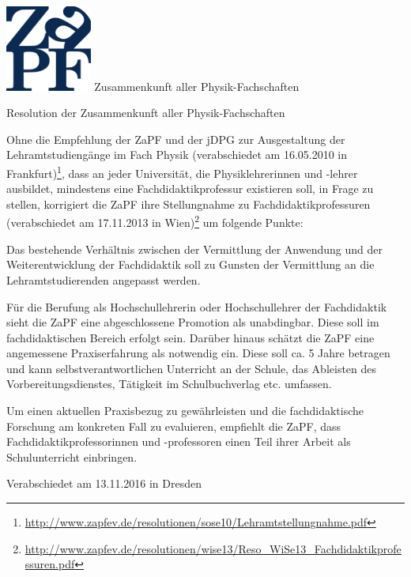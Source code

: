 \documentclass[DIV=calc]{scrartcl}
\begin{document}
\hspace{0.87\textwidth}
\begin{minipage}{120pt}
\vspace{-1.8cm}
\includegraphics[width=80pt]{logo.pdf}
\centering
\small Zusammenkunft aller Physik-Fachschaften
\end{minipage}
\begin{center}
\huge{Resolution der Zusammenkunft aller Physik-Fachschaften} \\
\normalsize
\end{center}

\vspace{1cm}

Ohne die Empfehlung der ZaPF und der jDPG zur Ausgestaltung der Lehramtstudiengänge im Fach Physik (verabschiedet am 16.05.2010 in Frankfurt)\footnote{\url{http://www.zapfev.de/resolutionen/sose10/Lehramtstellungnahme.pdf}}, dass an jeder Universität, die Physiklehrerinnen und -lehrer ausbildet, mindestens eine Fachdidaktikprofessur existieren soll, in Frage zu stellen, korrigiert die ZaPF ihre Stellungnahme zu Fachdidaktikprofessuren (verabschiedet am 17.11.2013 in Wien)\footnote{\url{http://www.zapfev.de/resolutionen/wise13/Reso_WiSe13_Fachdidaktikprofessuren.pdf}} um folgende Punkte:

Das bestehende Verhältnis zwischen der Vermittlung der Anwendung und der Weiterentwicklung der Fachdidaktik soll zu Gunsten der Vermittlung an die Lehramtstudierenden angepasst werden.

Für die Berufung als Hochschullehrerin oder Hochschullehrer der Fachdidaktik sieht die ZaPF eine abgeschlossene Promotion als unabdingbar. Diese soll im fachdidaktischen Bereich erfolgt sein. Darüber hinaus schätzt die ZaPF eine angemessene Praxiserfahrung als notwendig ein. Diese soll ca. 5 Jahre betragen und kann selbstverantwortlichen Unterricht an der Schule, das Ableisten des Vorbereitungsdienstes, Tätigkeit im Schulbuchverlag etc. umfassen.

Um einen aktuellen Praxisbezug zu gewährleisten und die fachdidaktische Forschung am konkreten Fall zu evaluieren, empfiehlt die ZaPF, dass Fachdidaktikprofessorinnen und -professoren einen Teil ihrer Arbeit als Schulunterricht einbringen.

\vfill
\begin{flushright}
Verabschiedet am 13.11.2016 in Dresden
\end{flushright}
\end{document}
